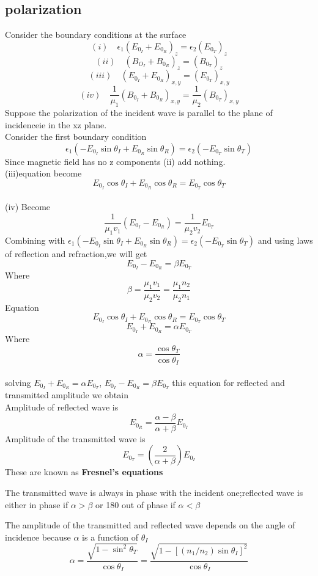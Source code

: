 \subsection{polarization}
Consider the boundary conditions at the surface\\
$$(i)\quad \epsilon_{1}(E_{0_I}+E_{0_R})_z=\epsilon_{2}(E_{0_T})_z$$
$$ (ii) \quad (B_{O_I}+B_{0_R})_z=(B_{0_T})_z$$
$$(iii) \quad (E_{0_I}+E_{0_R})_{x,y}=(E_{0_T})_{x,y}$$
$$(iv) \quad \frac{1}{\mu_{1}}(B_{0_I}+B_{0_R})_{x,y}=\frac{1}{\mu_{2}}(B_{0_T})_{x,y}$$
Suppose the polarization of the incident wave is parallel to the plane of incidenceie in the xz plane.\\
Consider the first boundary condition\\
$$\epsilon_{1}(-E_{0_I}\sin \theta_I+E_{0_R}\sin \theta_R)=\epsilon_{2}(-E_{0_T}\sin \theta_T)$$
Since magnetic field has no z components (ii) add nothing.\\
(iii)equation become\\
$$E_{0_I}\cos \theta_I+E_{0_R}\cos \theta_R=E_{0_T}\cos \theta_T$$\\
(iv) Become\\
$$\frac{1}{\mu_{1} v_1}(E_{0_I}-E_{0_R})=\frac{1}{\mu_{2} v_2}E_{0_T}$$
Combining with $\epsilon_{1}(-E_{0_I}\sin \theta_I+E_{0_R}\sin \theta_R)=\epsilon_{2}(-E_{0_T}\sin \theta_T)$ and using laws of reflection and refraction,we will get
$$E_{0_I}-E_{0_R}=\beta E_{0_T}$$
Where $$\beta= \frac{\mu_{1} v_1}{\mu_{2} v_2}=\frac{\mu_{1} n_2}{\mu_{2}n_1}$$
Equation $$E_{0_I}\cos \theta_I+E_{0_R}\cos \theta_R=E_{0_T}\cos \theta_T$$
$$E_{0_I}+E_{0_R}=\alpha E_{0_T}$$
Where $$\alpha=\frac{\cos \theta_T}{\cos \theta_I}$$\\
solving $E_{0_I}+E_{0_R}=\alpha E_{0_T}$, \quad $E_{0_I}-E_{0_R}=\beta E_{0_T}$ this equation for reflected and transmitted amplitude we obtain\\
Amplitude of reflected wave is\\
$$E_{0_R}=\frac{\alpha-\beta}{\alpha+\beta}E_{0_I}$$
Amplitude of the transmitted wave is\\
$$E_{0_T}=\left( \frac{2}{\alpha+\beta}\right)E_{0_I} $$
These are known as \textbf{Fresnel's equations}\\
\begin{note}
	The transmitted wave is always in phase with the incident one;reflected wave is either in phase if $\alpha>\beta$ or 180 out of phase if $\alpha< \beta$
\end{note}
The amplitude of the transmitted and reflected wave depends on the angle of incidence because $\alpha$ is a function of $\theta_I$
$$\alpha=\frac{\sqrt{1-\sin ^{2} \theta_{T}}}{\cos \theta_{I}}=\frac{\sqrt{1-\left[\left(n_{1} / n_{2}\right) \sin \theta_{I}\right]^{2}}}{\cos \theta_{I}}$$
